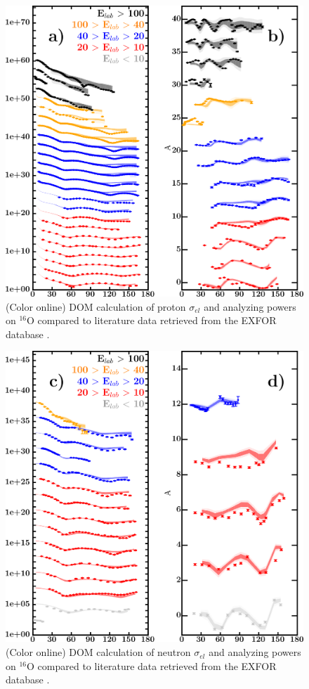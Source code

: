 \documentclass[twocolumn,secnumarabic,amssymb, nobibnotes, aps, prl,
superscriptaddress, nobalancelastpage]{revtex4}
\newcommand{\elasts}{\ensuremath{\sigma_{el}}\,\,}
\begin{document}
\begin{figure}
    \includegraphics[scale=0.35]{figures/o16_protonElastic.png}
    \caption{(Color online) DOM calculation of proton \elasts and analyzing
        powers on $^{16}$O compared to literature data retrieved from the EXFOR
        database \cite{EXFOR}.
    }
    \label{O16_pECS_DOMFit}
\end{figure}

\begin{figure}
    \includegraphics[scale=0.35]{figures/o16_neutronElastic.png}
    \caption{(Color online) DOM calculation of neutron \elasts and analyzing
        powers on $^{16}$O compared to literature data retrieved from the EXFOR
        database \cite{EXFOR}.
    }
    \label{O16_nECS_DOMFit}
\end{figure}
\end{document}
